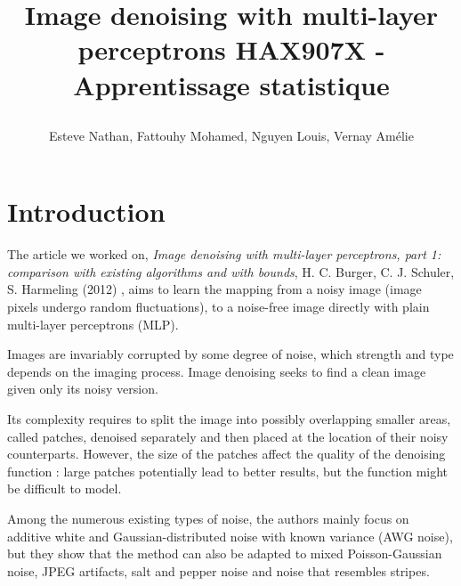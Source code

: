 \documentclass[10pt,a4paper]{article}
\author{Esteve Nathan, Fattouhy Mohamed, Nguyen Louis, Vernay Amélie}
\title{%
    \begin{minipage}\linewidth
        \centering
        Image denoising with multi-layer perceptrons
        \vskip3pt
        \large 
        HAX907X - Apprentissage statistique
    \end{minipage}
}
\newcommand{\svs}{\vspace{9pt}}
\begin{document}
\maketitle
\section{Introduction}

The article we worked on, \emph{Image denoising with multi-layer perceptrons, part 1: comparison with existing algorithms and with bounds}, H. C. Burger, C. J. Schuler, S. Harmeling (2012) \citep{denoise}, aims to learn the mapping from a noisy image (image pixels undergo random fluctuations), to a noise-free image directly with plain multi-layer perceptrons (MLP).

\svs

Images are invariably corrupted by some degree of noise, which strength and type depends on the imaging process. Image denoising seeks to find a clean image given only its noisy version.

\svs

Its complexity requires to split the image into possibly overlapping smaller areas, called patches, denoised separately and then placed at the location of their noisy counterparts. However, the size of the patches affect the quality of the denoising function : large patches potentially lead to better results, but the function might be difficult to model.

\svs

Among the numerous existing types of noise, the authors mainly focus on additive white and Gaussian-distributed noise with known variance (AWG noise), but they show that the method can also be adapted to mixed Poisson-Gaussian noise, JPEG artifacts, salt and pepper noise and noise that resembles stripes.

\svs



\end{document}
